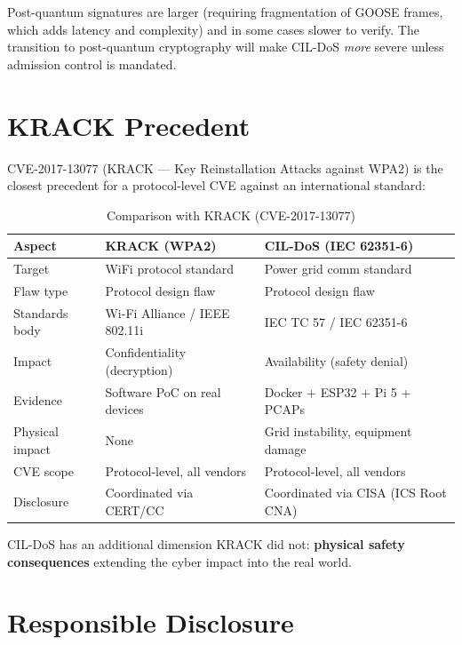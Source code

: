 \documentclass[11pt,a4paper]{article}
\begin{document}
Post-quantum signatures are larger (requiring fragmentation of GOOSE frames, which adds latency and complexity) and in some cases slower to verify. The transition to post-quantum cryptography will make CIL-DoS \emph{more} severe unless admission control is mandated.

\section{KRACK Precedent}

CVE-2017-13077 (KRACK --- Key Reinstallation Attacks against WPA2) is the closest precedent for a protocol-level CVE against an international standard:

\begin{table}[H]
\centering
\caption{Comparison with KRACK (CVE-2017-13077)}
\begin{tabularx}{\textwidth}{@{}lXX@{}}
\toprule
\textbf{Aspect} & \textbf{KRACK (WPA2)} & \textbf{CIL-DoS (IEC 62351-6)} \\
\midrule
Target & WiFi protocol standard & Power grid comm standard \\
Flaw type & Protocol design flaw & Protocol design flaw \\
Standards body & Wi-Fi Alliance / IEEE 802.11i & IEC TC 57 / IEC 62351-6 \\
Impact & Confidentiality (decryption) & Availability (safety denial) \\
Evidence & Software PoC on real devices & Docker + ESP32 + Pi 5 + PCAPs \\
Physical impact & None & Grid instability, equipment damage \\
CVE scope & Protocol-level, all vendors & Protocol-level, all vendors \\
Disclosure & Coordinated via CERT/CC & Coordinated via CISA (ICS Root CNA) \\
\bottomrule
\end{tabularx}
\end{table}

CIL-DoS has an additional dimension KRACK did not: \textbf{physical safety consequences} extending the cyber impact into the real world.

\section{Responsible Disclosure}
\end{document}
